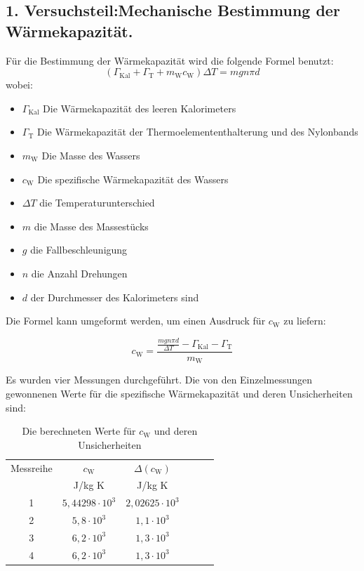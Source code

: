 \documentclass[11pt,a4paper]{article} %
\begin{document}
\subsection{1. Versuchsteil:Mechanische Bestimmung der Wärmekapazität.}

Für die Bestimmung der Wärmekapazität wird die folgende Formel benutzt:
\begin{equation}
(\Gamma_{\textrm{Kal}}+\Gamma_{\textrm{T}}+m_\textrm{W}c_\textrm{W})\Delta T = mgn\pi d
\end{equation}
wobei:
\begin{itemize}
	\item $\Gamma_{\textrm{Kal}}$ Die Wärmekapazität des leeren Kalorimeters
	\item $\Gamma_{\textrm{T}}$ Die Wärmekapazität der Thermoelemententhalterung und des Nylonbands
	\item $m_\textrm{W}$ Die Masse des Wassers
	\item $c_\textrm{W}$ Die spezifische Wärmekapazität des Wassers
	\item $\Delta T$ die Temperaturunterschied
	\item $m$ die Masse des Massestücks
	\item $g$ die Fallbeschleunigung
	\item $n$ die Anzahl Drehungen
	\item $d$ der Durchmesser des Kalorimeters sind
\end{itemize}

Die Formel kann umgeformt werden, um einen Ausdruck für $c_\textrm{W}$ zu liefern:

\begin{equation}
c_\textrm{W} = \frac{\frac{mgn\pi d}{\Delta T} - \Gamma_{\textrm{Kal}} - \Gamma_{\textrm{T}}}{m_\textrm{W}}
\end{equation}



Es wurden vier Messungen durchgeführt. Die von den Einzelmessungen gewonnenen Werte für die spezifische Wärmekapazität und deren Unsicherheiten sind:


\begin{table}[h]
	\centering
	\begin{tabular*}{0.99\textwidth}{@{\extracolsep{\fill}}cccccc}
		\toprule
		Messreihe & $c_\textrm{W}$ & $\Delta( c_\textrm{W})$  \\
		& J/kg K & J/kg K   \\
		\bottomrule
		1 & $5,44298 \cdot 10^{3}$ & $2,02625 \cdot 10^{3}$ \\
		2 & $5,8 \cdot 10^{3}$ & $1,1 \cdot 10^{3}$ \\
		3 & $6,2 \cdot 10^{3} $& $1,3 \cdot 10^{3}$ \\
		4 & $6,2 \cdot 10^{3}$ & $1,3 \cdot 10^{3}$ \\
		\bottomrule
	\end{tabular*}
	\caption{Die berechneten Werte für  $c_\textrm{W}$ und deren  Unsicherheiten}
	\label{tabelle}
\end{table}
\end{document}
